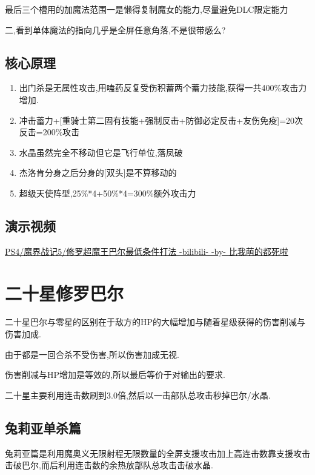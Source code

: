 	最后三个槽用的加魔法范围一是懒得复制魔女的能力,尽量避免DLC限定能力
	
	二,看到单体魔法的指向几乎是全屏任意角落,不是很带感么?

	\subsection{核心原理}

	\begin{enumerate}
		\item 出门杀是无属性攻击,用嗑药反复受伤积蓄两个蓄力技能,获得一共400\%攻击力增加.

		\item 冲击蓄力+[重骑士第二固有技能+强制反击+防御必定反击+友伤免疫]=20次反击=200\%攻击

		\item 水晶虽然完全不移动但它是飞行单位,落凤破

		\item 杰洛肯分身之后分身的[双头]是不算移动的
		
		\item 超级天使阵型,25\%*4+50\%*4=300\%额外攻击力
	\end{enumerate}

	\subsection{演示视频}
	\href{http://www.bilibili.com/video/av2976870/}{PS4/魔界战记5/修罗超魔王巴尔最低条件打法 -bilibili- -by- 比我萌的都死啦}


	\newpage

	\section{二十星修罗巴尔}

	二十星巴尔与零星的区别在于敌方的HP的大幅增加与随着星级获得的伤害削减与伤害加成.

	由于都是一回合杀不受伤害,所以伤害加成无视.

	伤害削减与HP增加是等效的,所以最后等价于对输出的要求.

	二十星主要利用连击数刷到3.0倍,然后以一击部队总攻击秒掉巴尔/水晶.

	\subsection{兔莉亚单杀篇}

	兔莉亚篇是利用魔奥义无限射程无限数量的全屏支援攻击加上高连击数靠支援攻击击破巴尔,而后利用连击数的余热放部队总攻击击破水晶.

